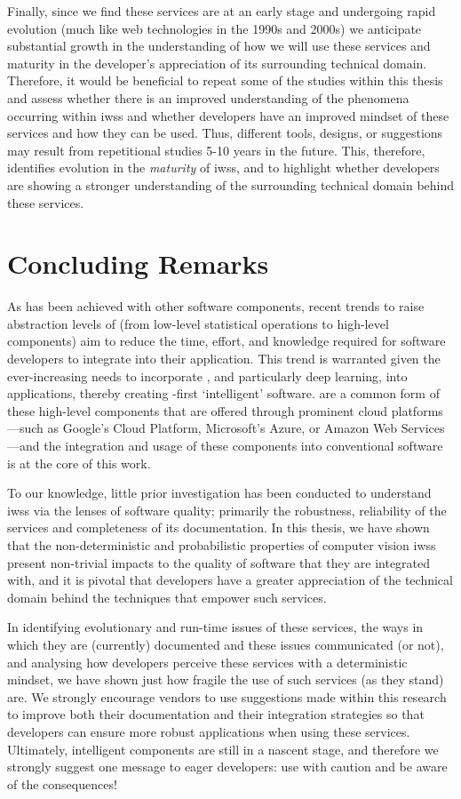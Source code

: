 Finally, since we find these services are at an early stage and undergoing rapid evolution (much like web technologies in the 1990s and 2000s) we anticipate substantial growth in the understanding of how we will use these services and maturity in the developer's appreciation of its surrounding technical domain. Therefore, it would be beneficial to repeat some of the studies within this thesis and assess whether there is an improved understanding of the phenomena occurring within \glspl{iws} and whether developers have an improved mindset of these services and how they can be used. Thus, different tools, designs, or suggestions may result from repetitional studies 5-10 years in the future. This, therefore, identifies evolution in the \textit{maturity} of \glspl{iws}, and to highlight whether developers are showing a stronger understanding of the surrounding technical domain behind these services.

\section{Concluding Remarks}

As has been achieved with other software components, recent trends to raise abstraction levels of  (from low-level statistical operations to high-level  components) aim to reduce the time, effort, and knowledge required for software developers to integrate  into their application. This trend is warranted given the ever-increasing needs to incorporate , and particularly deep learning, into applications, thereby creating -first `intelligent' software.  are a common form of these high-level  components that are offered through prominent cloud platforms---such as Google's Cloud Platform, Microsoft's Azure, or Amazon Web Services---and the integration and usage of these components into conventional software is at the core of this work.

To our knowledge, little prior investigation has been conducted to understand \glspl{iws} via the lenses of software quality; primarily the robustness, reliability of the services and completeness of its documentation. In this thesis, we have shown that the non-deterministic and probabilistic properties of computer vision \glspl{iws} present non-trivial impacts to the quality of software that they are integrated with, and it is pivotal that developers have a greater appreciation of the technical domain behind the  techniques that empower such services. 

In identifying evolutionary and run-time issues of these services, the ways in which they are (currently) documented and these issues communicated (or not), and analysing how developers perceive these services with a deterministic mindset, we have shown just how fragile the use of such services (as they stand) are. We strongly encourage vendors to use suggestions made within this research to improve both their documentation and their integration strategies so that developers can ensure more robust applications when using these services. Ultimately, intelligent  components are still in a nascent stage, and therefore we strongly suggest one message to eager developers: use with caution and be aware of the consequences!
